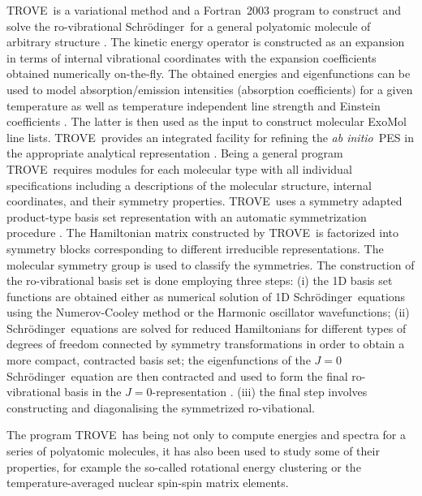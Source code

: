 \documentclass[12pt]{article}
\newcommand{\trove}{{\sc TROVE}}
\newcommand{\schr}{Schr\"{o}dinger}
\newcommand{\ai}{\textit{ab initio}}
\newcommand{\2}{$_{2}$}
\newcommand{\3}{$_{3}$}
\newcommand{\4}{$_{4}$}
\begin{document}
\trove\ is a variational method and a Fortran~2003 program to
construct and solve the ro-vibrational \schr\ for a general polyatomic
molecule of arbitrary structure \citet{TROVE}. The kinetic energy
operator is constructed as an expansion in terms of internal
vibrational coordinates with the expansion coefficients obtained
numerically on-the-fly.  The obtained energies and eigenfunctions can
be used to model absorption/emission intensities (absorption
coefficients) for a given temperature as well as temperature
independent line strength and Einstein coefficients
\cite{05YuThCa.method}. The latter is then used as the input to
construct molecular ExoMol line lists. \trove\ provides an integrated
facility for refining the \ai\ PES in the appropriate analytical
representation \cite{11YuBaTe.NH3}. Being a general program \trove\
requires modules for each molecular type with all individual
specifications including a descriptions of the molecular structure,
internal coordinates, and their symmetry properties. \trove\ uses a
symmetry adapted product-type basis set representation with an
automatic symmetrization procedure \cite{16YuYaxx.methods}. The
Hamiltonian matrix constructed by \trove\ is factorized into symmetry
blocks corresponding to different irreducible representations. The
molecular symmetry group \cite{04BuJexx.method} is used to classify
the symmetries.  The construction of the ro-vibrational basis set is
done employing three steps: (i) the 1D basis set functions are
obtained either as numerical solution of 1D \schr\ equations using the
Numerov-Cooley method \cite{23Nuxxxx.method,61Coxxxx.method} or the
Harmonic oscillator wavefunctions; (ii) \schr\ equations are solved
for reduced Hamiltonians for different types of degrees of freedom
connected by symmetry transformations in order to obtain a more
compact, contracted basis set; the eigenfunctions of the $J=0$ \schr\
equation are then contracted and used to form the final ro-vibrational
basis in the $J=0$-representation \citet{09YuBaYa.NH3}. (iii) the
final step involves constructing and diagonalising the symmetrized
ro-vibational.

The program \trove\ has being not only to compute energies and spectra for a series of polyatomic molecules, it has also been used to study some of their properties, for example the so-called rotational energy clustering\cite{09YuOvTh.SbH3,14UnYuTe.SO3} or the temperature-averaged nuclear spin-spin matrix elements\cite{10YaYuPa.NH3}.
\end{document}
